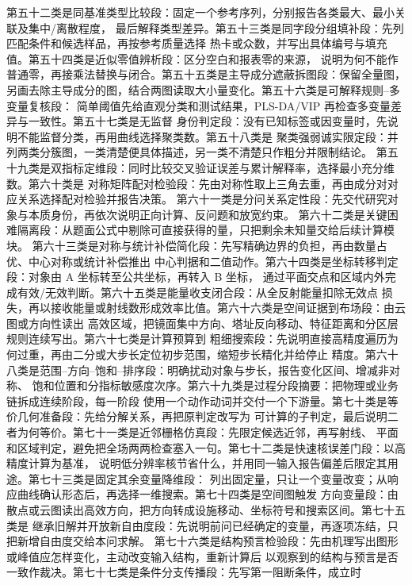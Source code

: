 第五十二类是同基准类型比较段：固定一个参考序列，分别报告各类最大、最小关联及集中/离散程度，
最后解释类型差异。第五十三类是同字段分组填补段：先列匹配条件和候选样品，再按参考质量选择
热卡或众数，并写出具体编号与填充值。第五十四类是近似零值辨析段：区分空白和报表零的来源，
说明为何不能作普通零，再接乘法替换与闭合。第五十五类是主导成分遮蔽拆图段：保留全量图，
另画去除主导成分的图，结合两图读取大小量变化。第五十六类是可解释规则--多变量复核段：
简单阈值先给直观分类和测试结果，PLS-DA/VIP 再检查多变量差异与一致性。第五十七类是无监督
身份判定段：没有已知标签或因变量时，先说明不能监督分类，再用曲线选择聚类数。第五十八类是
聚类强弱诚实限定段：并列两类分簇图，一类清楚便具体描述，另一类不清楚只作粗分并限制结论。
第五十九类是双指标定维段：同时比较交叉验证误差与累计解释率，选择最小充分维数。第六十类是
对称矩阵配对检验段：先由对称性取上三角去重，再由成分对对应关系选择配对检验并报告决策。
第六十一类是分问关系定性段：先交代研究对象与本质身份，再依次说明正向计算、反问题和放宽约束。
第六十二类是关键困难隔离段：从题面公式中剔除可直接获得的量，只把剩余未知量交给后续计算模块。
第六十三类是对称与统计补偿简化段：先写精确边界的负担，再由数量占优、中心对称或统计补偿推出
中心判据和二值动作。第六十四类是坐标转移判定段：对象由 A 坐标转至公共坐标，再转入 B 坐标，
通过平面交点和区域内外完成有效/无效判断。第六十五类是能量收支闭合段：从全反射能量扣除无效点
损失，再以接收能量或射线数形成效率比值。第六十六类是空间证据到布场段：由云图或方向性读出
高效区域，把镜面集中方向、塔址反向移动、特征距离和分区层规则连续写出。第六十七类是计算预算到
粗细搜索段：先说明直接高精度遍历为何过重，再由二分或大步长定位初步范围，缩短步长精化并给停止
精度。第六十八类是范围--方向--饱和--排序段：明确扰动对象与步长，报告变化区间、增减非对称、
饱和位置和分指标敏感度次序。第六十九类是过程分段摘要：把物理或业务链拆成连续阶段，每一阶段
使用一个动作动词并交付一个下游量。第七十类是等价几何准备段：先给分解关系，再把原判定改写为
可计算的子判定，最后说明二者为何等价。第七十一类是近邻栅格仿真段：先限定候选近邻，再写射线、
平面和区域判定，避免把全场两两检查塞入一句。第七十二类是快速核误差门段：以高精度计算为基准，
说明低分辨率核节省什么，并用同一输入报告偏差后限定其用途。第七十三类是固定其余变量降维段：
列出固定量，只让一个变量改变；从响应曲线确认形态后，再选择一维搜索。第七十四类是空间图触发
方向变量段：由散点或云图读出高效方向，把方向转成设施移动、坐标符号和搜索区间。第七十五类是
继承旧解并开放新自由度段：先说明前问已经确定的变量，再逐项冻结，只把新增自由度交给本问求解。
第七十六类是结构预言检验段：先由机理写出图形或峰值应怎样变化，主动改变输入结构，重新计算后
以观察到的结构与预言是否一致作裁决。第七十七类是条件分支传播段：先写第一阻断条件，成立时

